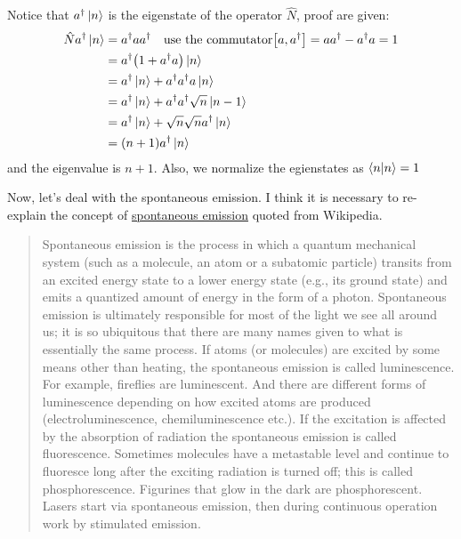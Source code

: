 \documentclass[12pt,openany]{book}
\begin{document}
	Notice that $a^\dagger\ket{n}$ is the eigenstate of the operator $\hat{N}$, proof are given:
	\begin{equation}
	\begin{aligned}
			\hat{N}a^\dagger\ket{n}&=a^\dagger a a^\dagger\quad \text{use the commutator}\big[a,a^\dagger\big]=aa^\dagger-a^\dagger a=1\\
			                       &=a^\dagger \big(1+a^\dagger a\big)\ket{n}\\
			                       &=a^\dagger\ket{n}+a^\dagger a^\dagger a\ket{n}\\
			                       &=a^\dagger\ket{n}+a^\dagger a^\dagger\sqrt{n}\ket{n-1}\\
			                       &=a^\dagger\ket{n}+\sqrt{n}\sqrt{n}a^\dagger\ket{n}\\
			                       &=(n+1)a^\dagger\ket{n}
	\end{aligned}
	\end{equation}
	and the eigenvalue is $n+1$. Also, we normalize the egienstates as $\braket{n|n}=1
	$\par 
	Now, let's deal with the spontaneous emission. I think it is necessary to re-explain the concept of
	\href{https://en.wikipedia.org/wiki/Spontaneous_emission}{spontaneous emission} quoted from Wikipedia.
	\begin{quotation}
	Spontaneous emission is the process in which a quantum mechanical system (such as a molecule, an atom or a subatomic particle) transits from an excited energy state to a lower energy state (e.g., its ground state) and emits a quantized amount of energy in the form of a photon.
	Spontaneous emission is ultimately responsible for most of the light we see all around us; it is so ubiquitous that there are many names given to what is essentially the same process.
    If atoms (or molecules) are excited by some means other than heating,
	the spontaneous emission is called luminescence.
	For example, fireflies are luminescent.
	And there are different forms of luminescence depending on how excited atoms are produced (electroluminescence, chemiluminescence etc.).
	If the excitation is affected by the absorption of radiation the spontaneous emission is called fluorescence. 
	Sometimes molecules have a metastable level and continue to fluoresce long after the exciting radiation is turned off; this is called phosphorescence.
	Figurines that glow in the dark are phosphorescent.
	Lasers start via spontaneous emission, then during continuous operation work by stimulated emission.
	\end{quotation}
\end{document}
